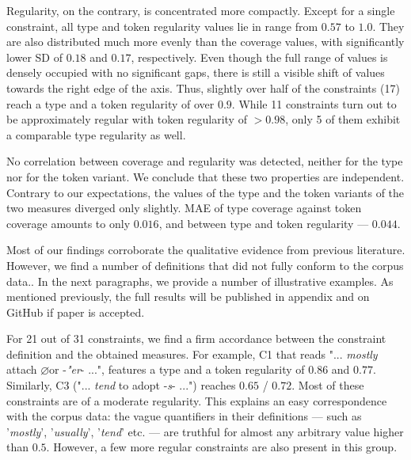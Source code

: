 \documentclass[10pt, a4paper]{article}
\newcommand{\zeroLinker}{\ensuremath{\boldsymbol{\varnothing}}}
\begin{document}
Regularity, on the contrary, is concentrated more compactly. Except for a single constraint, all type and token regularity values lie in range from $0.57$ to $1.0$. They are also distributed much more evenly than the coverage values, with significantly lower SD of $0.18$ and $0.17$, respectively. Even though the full range of values is densely occupied with no significant gaps, there is still a visible shift of values towards the right edge of the axis. Thus, slightly over half of the constraints (17) reach a type and a token regularity of over $0.9$. While 11 constraints turn out to be approximately regular with token regularity of $>0.98$, only 5 of them exhibit a comparable type regularity as well.

No correlation between coverage and regularity was detected, neither for the type nor for the token variant. We conclude that these two properties are independent. Contrary to our expectations, the values of the type and the token variants of the two measures diverged only slightly. MAE of type coverage against token coverage amounts to only $0.016$, and between type and token regularity --- $0.044$.


Most of our findings corroborate the qualitative evidence from previous literature. However, we find a number of definitions that did not fully conform to the corpus data.. In the next paragraphs, we provide a number of illustrative examples. As mentioned previously, the full results will be published in appendix and on GitHub if paper is accepted.

For 21 out of 31 constraints, we find a firm accordance between the constraint definition and the obtained measures. For example, C1 that reads  "... \textit{mostly} attach \zeroLinker or -\textit{"er}- ...", features a type and a token regularity of $0.86$ and $0.77$. Similarly, C3 ("... \textit{tend} to adopt -\textit{s}- ...") reaches $0.65$ / $0.72$. Most of these constraints are of a moderate regularity. This explains an easy correspondence with the corpus data: the vague quantifiers in their definitions --- such as '\textit{mostly}', '\textit{usually}', '\textit{tend}' etc. --- are truthful for almost any arbitrary value higher than $0.5$. However, a few more regular constraints are also present in this group.
\end{document}
